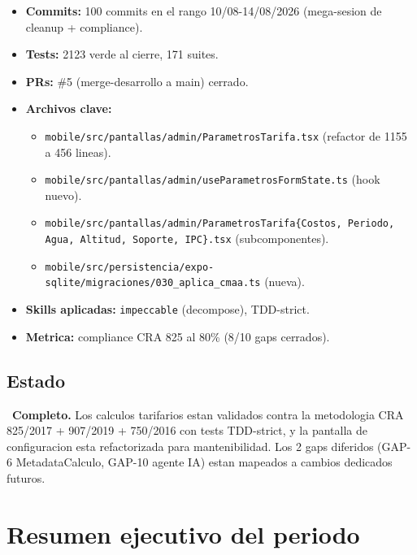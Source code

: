 \documentclass[11pt,a4paper,oneside]{report}
\begin{document}
\begin{itemize}[leftmargin=*]
    \item \textbf{Commits:} 100 commits en el rango 10/08-14/08/2026 (mega-sesion de cleanup + compliance).
    \item \textbf{Tests:} 2123 verde al cierre, 171 suites.
    \item \textbf{PRs:} \#5 (merge-desarrollo a main) cerrado.
    \item \textbf{Archivos clave:}
    \begin{itemize}
        \item \texttt{mobile/src/pantallas/admin/ParametrosTarifa.tsx} (refactor de 1155 a 456 lineas).
        \item \texttt{mobile/src/pantallas/admin/useParametrosFormState.ts} (hook nuevo).
        \item \texttt{mobile/src/pantallas/admin/ParametrosTarifa\{Costos, Periodo, Agua, Altitud, Soporte, IPC\}.tsx} (subcomponentes).
        \item \texttt{mobile/src/persistencia/expo-sqlite/migraciones/030\_aplica\_cmaa.ts} (nueva).
    \end{itemize}
    \item \textbf{Skills aplicadas:} \texttt{impeccable} (decompose), TDD-strict.
    \item \textbf{Metrica:} compliance CRA 825 al 80\% (8/10 gaps cerrados).
\end{itemize}

\section{Estado}

\checkmark\ \textbf{Completo.} Los calculos tarifarios estan validados contra la metodologia CRA 825/2017 + 907/2019 + 750/2016 con tests TDD-strict, y la pantalla de configuracion esta refactorizada para mantenibilidad. Los 2 gaps diferidos (GAP-6 MetadataCalculo, GAP-10 agente IA) estan mapeados a cambios dedicados futuros.


\chapter{Resumen ejecutivo del periodo}
\end{document}
